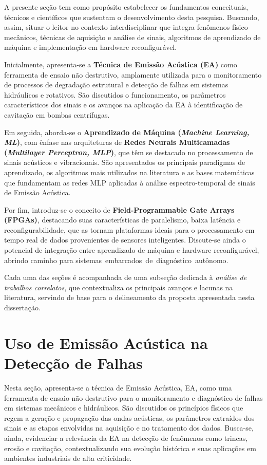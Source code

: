 A presente seção tem como propósito estabelecer os fundamentos conceituais, técnicos e científicos que sustentam o desenvolvimento desta pesquisa. Buscando, assim, situar o leitor no contexto interdisciplinar que integra fenômenos físico-mecânicos, técnicas de aquisição e análise de sinais, algoritmos de aprendizado de máquina e implementação em hardware reconfigurável.

Inicialmente, apresenta-se a \textbf{Técnica de Emissão Acústica (EA)} como ferramenta de ensaio não destrutivo, amplamente utilizada para o monitoramento de processos de degradação estrutural e detecção de falhas em sistemas hidráulicos e rotativos. São discutidos o funcionamento, os parâmetros característicos dos sinais e os avanços na aplicação da EA à identificação de cavitação em bombas centrífugas.

Em seguida, aborda-se o \textbf{Aprendizado de Máquina (\textit{Machine Learning, ML})}, com ênfase nas arquiteturas de \textbf{Redes Neurais Multicamadas (\textit{Multilayer Perceptron, MLP})}, que têm se destacado no processamento de sinais acústicos e vibracionais. São apresentados os principais paradigmas de aprendizado, os algoritmos mais utilizados na literatura e as bases matemáticas que fundamentam as redes MLP aplicadas à análise espectro-temporal de sinais de Emissão Acústica.

Por fim, introduz-se o conceito de \textbf{Field-Programmable Gate Arrays (FPGAs)}, destacando suas características de paralelismo, baixa latência e reconfigurabilidade, que as tornam plataformas ideais para o processamento em tempo real de dados provenientes de sensores inteligentes. Discute-se ainda o potencial de integração entre aprendizado de máquina e hardware reconfigurável, abrindo caminho para \mbox{sistemas embarcados de diagnóstico autônomo.}

Cada uma das seções é acompanhada de uma subseção dedicada à \textit{análise de trabalhos correlatos}, que contextualiza os principais avanços e lacunas na literatura, servindo de base para o delineamento da proposta apresentada nesta dissertação.


\section{Uso de Emissão Acústica na Detecção de Falhas}\label{sec:UsoEA}

Nesta seção, apresenta-se a técnica de Emissão Acústica, EA, como uma ferramenta de ensaio não destrutivo para o monitoramento e diagnóstico de falhas em sistemas mecânicos e hidráulicos. São discutidos os princípios físicos que regem a geração e propagação das ondas acústicas, os  parâmetros extraídos dos sinais e as etapas envolvidas na aquisição e no tratamento dos dados. Busca-se, ainda, evidenciar a relevância da EA na detecção de fenômenos como trincas, erosão e cavitação, contextualizando sua evolução histórica e suas aplicações em ambientes industriais de alta criticidade.

